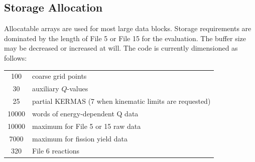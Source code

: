 \subsection{Storage Allocation}
\label{ssHEATR_storage}

Allocatable arrays are used for most large data blocks.  Storage
requirements are dominated by the length of File 5 or File 15 for
the evaluation. The  buffer size  may
be decreased or increased at will.  The code is
currently dimensioned as follows:

\begin{center}
\begin{tabular}{cl}
100 & coarse grid points \\
30 & auxiliary $Q$-values \\
25 & partial KERMAS (7 when kinematic limits are requested) \\
10000 & words of energy-dependent Q data \\
10000 & maximum for File 5 or 15 raw data \\
7000 & maximum for fission yield data \\
320 & File 6 reactions
\end{tabular}
\end{center}

\cleardoublepage

